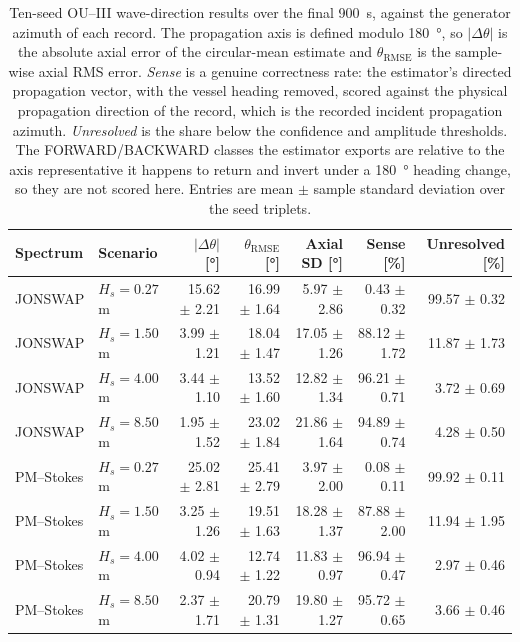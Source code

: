 \begin{table}[t]
  \centering
  \caption{Ten-seed OU--III wave-direction results over the final \SI{900}{s}, against the generator azimuth of each record. The propagation axis is defined modulo \SI{180}{\degree}, so $|\Delta\theta|$ is the absolute axial error of the circular-mean estimate and $\theta_{\mathrm{RMSE}}$ is the sample-wise axial RMS error. \emph{Sense} is a genuine correctness rate: the estimator's directed propagation vector, with the vessel heading removed, scored against the physical propagation direction of the record, which is the recorded incident propagation azimuth. \emph{Unresolved} is the share below the confidence and amplitude thresholds. The FORWARD/BACKWARD classes the estimator exports are relative to the axis representative it happens to return and invert under a \SI{180}{\degree} heading change, so they are not scored here. Entries are mean $\pm$ sample standard deviation over the seed triplets.}
  \label{tab:ou_mc_direction}
  \footnotesize
  \setlength{\tabcolsep}{3.6pt}
  \begin{tabular}{@{}llrrrrr@{}}
    \toprule
    Spectrum & Scenario & $|\Delta\theta|$ [\si{\degree}] & $\theta_{\mathrm{RMSE}}$ [\si{\degree}] & Axial SD [\si{\degree}] & Sense [\%] & Unresolved [\%] \\
    \midrule
    JONSWAP & $H_s=0.27$ m & 15.62 $\pm$ 2.21 & 16.99 $\pm$ 1.64 & 5.97 $\pm$ 2.86 & 0.43 $\pm$ 0.32 & 99.57 $\pm$ 0.32 \\
    JONSWAP & $H_s=1.50$ m & 3.99 $\pm$ 1.21 & 18.04 $\pm$ 1.47 & 17.05 $\pm$ 1.26 & 88.12 $\pm$ 1.72 & 11.87 $\pm$ 1.73 \\
    JONSWAP & $H_s=4.00$ m & 3.44 $\pm$ 1.10 & 13.52 $\pm$ 1.60 & 12.82 $\pm$ 1.34 & 96.21 $\pm$ 0.71 & 3.72 $\pm$ 0.69 \\
    JONSWAP & $H_s=8.50$ m & 1.95 $\pm$ 1.52 & 23.02 $\pm$ 1.84 & 21.86 $\pm$ 1.64 & 94.89 $\pm$ 0.74 & 4.28 $\pm$ 0.50 \\
    PM--Stokes & $H_s=0.27$ m & 25.02 $\pm$ 2.81 & 25.41 $\pm$ 2.79 & 3.97 $\pm$ 2.00 & 0.08 $\pm$ 0.11 & 99.92 $\pm$ 0.11 \\
    PM--Stokes & $H_s=1.50$ m & 3.25 $\pm$ 1.26 & 19.51 $\pm$ 1.63 & 18.28 $\pm$ 1.37 & 87.88 $\pm$ 2.00 & 11.94 $\pm$ 1.95 \\
    PM--Stokes & $H_s=4.00$ m & 4.02 $\pm$ 0.94 & 12.74 $\pm$ 1.22 & 11.83 $\pm$ 0.97 & 96.94 $\pm$ 0.47 & 2.97 $\pm$ 0.46 \\
    PM--Stokes & $H_s=8.50$ m & 2.37 $\pm$ 1.71 & 20.79 $\pm$ 1.31 & 19.80 $\pm$ 1.27 & 95.72 $\pm$ 0.65 & 3.66 $\pm$ 0.46 \\
    \bottomrule
  \end{tabular}
\end{table}

